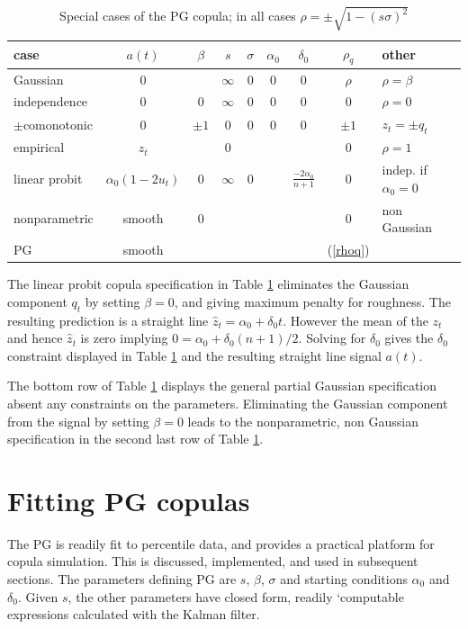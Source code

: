 \documentclass[authoryear]{elsarticle}
\newcommand{\eref}[1]{(\ref{#1})}
\newcommand{\tref}[1]{Table \ref{#1}}
\begin{document}
 \begin{table}[htdp]
\caption{Special cases of the PG copula; in all cases $\rho=\pm\sqrt{1-(s\sigma)^2}$}\label{pg}
\begin{center}
\begin{tabular}{l|c|ccccc|c|l}
\hline
case& $a(t)$ & $\beta$ &$s$ & $\sigma$ & $\alpha_0$&$\delta_0$ & $\rho_q$ & other\\
\hline
Gaussian & 0 &  & $\infty$ & $0$&  0&0 &$\rho$&$\rho=\beta$\\
independence &  0 & 0 & $\infty$&0 & 0 & 0&0 &$\rho=0$\\
$\pm$comonotonic  & 0 &$\pm 1$ &0 & 0 &0 & 0 &$\pm1$ &$z_t=\pm q_t$  \\
empirical  & $z_t$ &  & $0$  &  &   &  &0 &$\rho=1$ \\ 
linear probit &$\alpha_0(1-2u_t)$&  0 &  $\infty$ &0& & $\frac{-2\alpha_0}{n+1}$& 0 &indep. if $\alpha_0=0$\\
nonparametric & smooth  & 0 & & & & & 0 & non Gaussian \\
PG & smooth & & & & & &\eref{rhoq}&  \\
\hline
\end{tabular}
\end{center}
\end{table}%

The linear probit copula specification in \tref{pg}  eliminates the Gaussian component $q_t$ by setting $\beta=0$, and giving maximum penalty for roughness.   The resulting prediction  is a straight line $\hat z_t=\alpha_0+\delta_0 t$.  However the mean of the $z_t$ and hence $\hat z_t$ is zero implying $0=\alpha_0 + \delta_0(n+1)/2$.   Solving for $\delta_0$ gives the $\delta_0$ constraint displayed in \tref{pg} and the resulting straight line signal $a(t)$.

The bottom row of \tref{pg} displays the general partial Gaussian specification absent  any constraints on the parameters.  Eliminating the Gaussian component from the signal by setting $\beta=0$ leads to the nonparametric, non Gaussian specification in the second last row of \tref{pg}.

\section{Fitting PG copulas}
 The PG is readily  fit to percentile data, and provides a practical platform for copula simulation.  This is discussed, implemented, and used in subsequent sections.  The  parameters defining PG are $s$, $\beta$,  $\sigma$ and starting conditions $\alpha_0$ and $\delta_0$.  Given $s$, the other parameters have  closed form, readily `computable expressions calculated with the Kalman filter.
 
\end{document}
